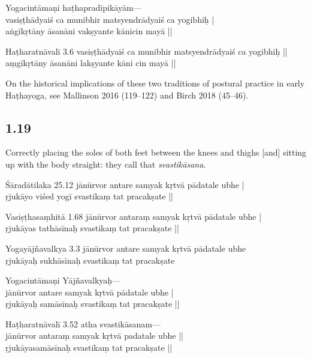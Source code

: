 \begin{ekdosis}
\begin{testimonia}[hp01_018]
Yogacintāmaṇi
\startverse
haṭhapradīpikāyām—\\
vasiṣṭhādyaiś ca munibhir matsyendrādyaiś ca yogibhiḥ |\\
aṅgīkṛtāny āsanāni vakṣyante kānicin mayā ||
\endverse

Haṭharatnāvalī 3.6
\startverse
vasiṣṭhādyaiś ca munibhir matsyendrādyaiś ca yogibhiḥ ||\\
aṃgīkṛtāny āsanāni lakṣyante kāni cin mayā ||
\endverse
\end{testimonia}

\begin{philcomm}[hp01_018]        
On the historical implications of these two traditions of postural practice in early Haṭhayoga, see Mallinson 2016 (119–122) and Birch 2018 (45–46).
\end{philcomm}

\subsection*{1.19}
\begin{translation}[hp01_019]
Correctly placing the soles of both feet between the knees and thighs [and] sitting up with the body straight: they call that \emph{svastikāsana}.
\end{translation}

\begin{sources}[hp01_019]
Śāradātilaka 25.12
\startverse
jānūrvor antare  samyak  kṛtvā  pādatale ubhe |\\
ṛjukāyo viśed yogī svastikaṃ tat pracakṣate ||
\endverse

Vasiṣṭhasaṃhitā 1.68
\startverse
jānūrvor antaraṃ samyak kṛtvā pādatale ubhe |\\
ṛjukāyas tathāsīnaḥ svastikaṃ tat pracakṣate ||
\endverse

Yogayājñavalkya 3.3
\startverse
jānūrvor antare samyak kṛtvā pādatale ubhe\\
ṛjukāyaḥ sukhāsīnaḥ svastikaṃ tat pracakṣate
\endverse
\end{sources}

\begin{testimonia}[hp01_019]
Yogacintāmaṇi
\startverse
Yājñavalkyaḥ—\\
jānūrvor antare samyak kṛtvā pādatale ubhe |\\
ṛjukāyaḥ samāsīnaḥ svastikaṃ tat pracakṣate ||
\endverse

Haṭharatnāvalī 3.52
\startverse
atha svastikāsanam---\\
jānūrvor antaraṃ samyak kṛtvā padatale ubhe ||\\
ṛjukāyasamāsīnaḥ svastikaṃ tat pracakṣate || 
\endverse


\end{testimonia}
\end{ekdosis}

